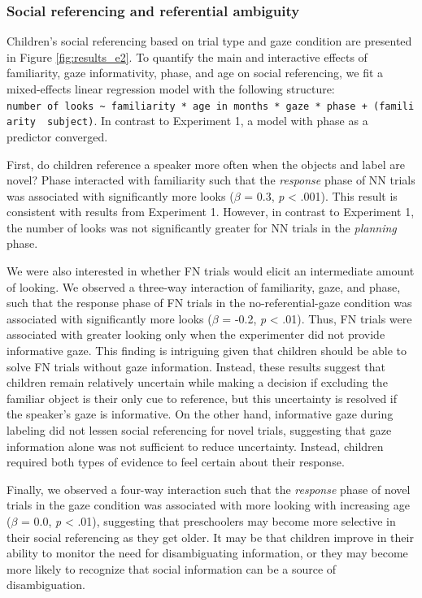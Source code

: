 \documentclass[a4paper,man,apacite,floatsintext]{apa6}
\begin{document}
\subsubsection{Social referencing and referential
ambiguity}\label{social-referencing-and-referential-ambiguity}

Children's social referencing based on trial type and gaze condition are
presented in Figure \ref{fig:results_e2}. To quantify the main and
interactive effects of familiarity, gaze informativity, phase, and age
on social referencing, we fit a mixed-effects linear regression model
with the following structure:
\texttt{number\ of\ looks\ \textasciitilde{}\ familiarity\ *\ age\ in\ months\ *\ gaze\ *\ phase\ +\ (familiarity\ \textbar{}\ subject)}.
In contrast to Experiment 1, a model with phase as a predictor
converged.

First, do children reference a speaker more often when the objects and
label are novel? Phase interacted with familiarity such that the
\emph{response} phase of NN trials was associated with significantly
more looks (\(\beta\) = 0.3, \emph{p} \textless{} .001). This result is
consistent with results from Experiment 1. However, in contrast to
Experiment 1, the number of looks was not significantly greater for NN
trials in the \emph{planning} phase.

We were also interested in whether FN trials would elicit an
intermediate amount of looking. We observed a three-way interaction of
familiarity, gaze, and phase, such that the response phase of FN trials
in the no-referential-gaze condition was associated with significantly
more looks (\(\beta\) = -0.2, \emph{p} \textless{} .01). Thus, FN trials
were associated with greater looking only when the experimenter did not
provide informative gaze. This finding is intriguing given that children
should be able to solve FN trials without gaze information. Instead,
these results suggest that children remain relatively uncertain while
making a decision if excluding the familiar object is their only cue to
reference, but this uncertainty is resolved if the speaker's gaze is
informative. On the other hand, informative gaze during labeling did not
lessen social referencing for novel trials, suggesting that gaze
information alone was not sufficient to reduce uncertainty. Instead,
children required both types of evidence to feel certain about their
response.

Finally, we observed a four-way interaction such that the
\emph{response} phase of novel trials in the gaze condition was
associated with more looking with increasing age (\(\beta\) = 0.0,
\emph{p} \textless{} .01), suggesting that preschoolers may become more
selective in their social referencing as they get older. It may be that
children improve in their ability to monitor the need for disambiguating
information, or they may become more likely to recognize that social
information can be a source of disambiguation.
\end{document}
